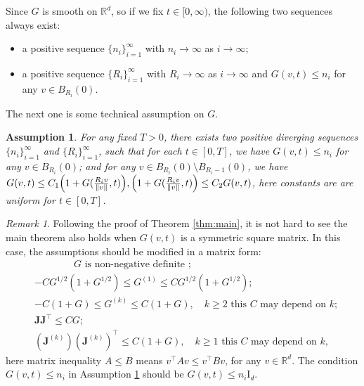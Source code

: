 \documentclass[a4paper, 11pt]{article}
\newcounter{results}[section]
\theoremstyle{plain}
\newtheorem{assumption}[results]{Assumption}
\theoremstyle{remark}
\newtheorem{remark}[results]{Remark}
\theoremstyle{definition}
\newcommand{\J}{\boldsymbol{J}}
\begin{document}
		
		Since $G$ is smooth on $\mathbb{R}^d$, so if we fix $t\in [0,\infty)$, the following two sequences always exist:
		\begin{itemize}
			\item a positive sequence $\{n_i\}_{i=1}^{\infty}$ with $n_i\to\infty$ as $i\to\infty$;
			\item a positive sequence $\{R_i\}_{i=1}^{\infty}$ with $R_i\to\infty$ as $i\to\infty$ and $G(v,t)\leq n_i$ for any $v\in B_{R_i}(0)$.
		\end{itemize} 
		
		The next one is some technical assumption on $G$.
		\begin{assumption}\label{asp:g2}For any fixed $T>0$, there exists two positive diverging sequences $\{n_i\}_{i=1}^{\infty}$ and $\{R_i\}_{i=1}^{\infty}$, such that for each $t\in [0,T]$, we have $G(v,t)\leq n_i$ for any $v\in B_{R_i}(0)$; and for any $v\in B_{R_i}(0)\setminus B_{R_i-1}(0)$, we have $G(v,t)\leq C_1 \Big(1+G(\frac{R_i v}{\norm{v}},t)\Big), \Big(1+G(\frac{R_i v}{\norm{v}},t)\Big)\leq C_2G(v,t)$, here constants are are uniform for $t\in [0,T]$.
		\end{assumption}

\begin{remark}
    Following the proof {of Theorem \ref{thm:main}}, it is not hard to see the main theorem also holds when $G(v,t)$ is a {symmetric} square matrix. In this case, the assumptions should be modified in a matrix form: \begin{equation*}
                        \begin{aligned}
                            &\qquad\qquad G\text{ is non-negative definite };\\
                            &-CG^{1/2}(1+G^{1/2})\leq G^{(1)}\leq CG^{1/2}(1+G^{1/2});\\
                        &-C(1+G)\leq G^{(k)}\leq C(1+G), \quad k\geq 2\text{ this $C$ may depend on $k$};\\
                        & \J\J^\top\leq CG;\\
                        & (\J^{(k)})(\J^{(k)})^\top\leq C(1+G),\quad k\geq 1\text{ this $C$ may depend on $k$},
                        \end{aligned}
                    \end{equation*}
    here matrix inequality $A\leq B$ means $v^\top Av\leq v^\top Bv$, for any $v\in\mathbb{R}^d$. The condition $G(v,t)\leq n_i$ in Assumption \ref{asp:g2} should be $G(v,t)\leq n_i\mathrm{I}_d$.
\end{remark}
\end{document}
